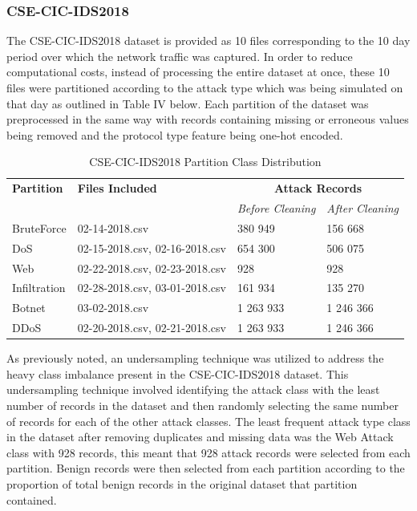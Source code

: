 \documentclass[conference]{IEEEtran}
\begin{document}
\subsubsection{CSE-CIC-IDS2018}
\noindent The CSE-CIC-IDS2018 dataset is provided as 10 files corresponding to the 10 day period over which the network traffic was captured. In order to reduce computational costs, instead of processing the entire dataset at once, these 10 files were partitioned according to the attack type which was being simulated on that day as outlined in Table IV below. Each partition of the dataset was preprocessed in the same way with records containing missing or erroneous values being removed and the protocol type feature being one-hot encoded. \\

\begin{table}[htbp]
\caption{CSE-CIC-IDS2018 Partition Class Distribution}
\begin{center}
\begin{tabular}{|p{1.25cm}|p{2cm}|p{2cm}|p{2cm}|}
\hline
\textbf{Partition} & \textbf{Files Included} &
\multicolumn{2}{|c|}{\textbf{Attack Records}} \\[15pt] %
\cline{3-4}
 & & \textit{Before Cleaning}& \textit{After Cleaning}\\[15pt]
\hline
BruteForce & 02-14-2018.csv & 380 949 & 156 668 \\[5pt] %
\hline 
DoS & 02-15-2018.csv, 02-16-2018.csv &
654 300 & 506 075 \\[5pt] %
\hline
Web & 02-22-2018.csv, 02-23-2018.csv &
928 & 928 \\[5pt] %
\hline
Infiltration & 02-28-2018.csv, 03-01-2018.csv &
161 934 & 135 270 \\[5pt] %
\hline 
Botnet  & 03-02-2018.csv &
1 263 933 & 1 246 366 \\[5pt] %
\hline
DDoS & 02-20-2018.csv, 02-21-2018.csv &
1 263 933 & 1 246 366 \\[5pt] %
\hline
\end{tabular}
\label{tab1}
\end{center}
\end{table}

As previously noted, an undersampling technique was utilized to address the heavy class imbalance present in the CSE-CIC-IDS2018 dataset. This undersampling technique involved identifying the attack class with the least number of records in the dataset and then randomly selecting the same number of records for each of the other attack classes. The least frequent attack type class in the dataset after removing duplicates and missing data was the Web Attack class with 928 records, this meant that 928 attack records were selected from each partition. Benign records were then selected from each partition according to the proportion of total benign records in the original dataset that partition contained. 
\end{document}
